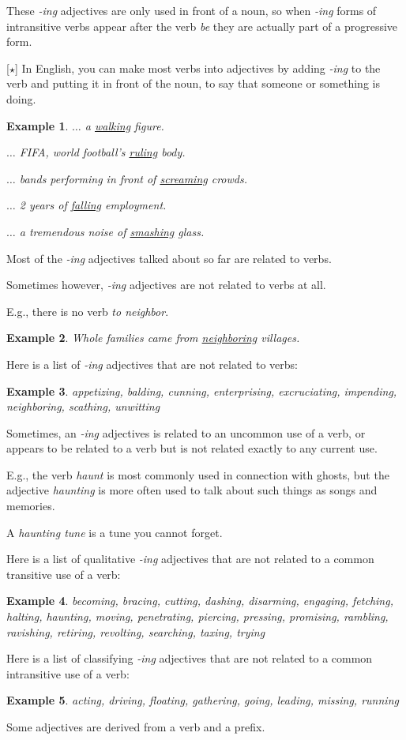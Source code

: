 \documentclass[oneside]{book}
\numberwithin{equation}{section}
\newtheorem{example}{Example}[section]
\begin{document}
%
\noindent{} These \textit{-ing} adjectives are only used in front of a noun, so when \textit{-ing} forms of intransitive verbs appear after the verb \textit{be} they are actually part of a progressive form.

%
\noindent{} [$\star$] In English, you can make most verbs into adjectives by adding \textit{-ing} to the verb and putting it in front of the noun, to say that someone or something is doing.
\begin{example}
    $\ldots$ a \underline{walking} figure.
    
    $\ldots$ FIFA, world football's \underline{ruling} body.
    
    $\ldots$ bands performing in front of \underline{screaming} crowds.
    
    $\ldots$ 2 years of \underline{falling} employment.
    
    $\ldots$ a tremendous noise of \underline{smashing} glass.
\end{example}
%
\noindent{} Most of the \textit{-ing} adjectives talked about so far are related to verbs.

Sometimes however, \textit{-ing} adjectives are not related to verbs at all.

E.g., there is no verb \textit{to neighbor}.
\begin{example}
    Whole families came from \underline{neighboring} villages.
\end{example}
Here is a list of \textit{-ing} adjectives that are not related to verbs:
\begin{example}
    appetizing, balding, cunning, enterprising, excruciating, impending, neighboring, scathing, unwitting
\end{example}
%
\noindent{} Sometimes, an \textit{-ing} adjectives is related to an uncommon use of a verb, or appears to be related to a verb but is not related exactly to any current use.

E.g., the verb \textit{haunt} is most commonly used in connection with ghosts, but the adjective \textit{haunting} is more often used to talk about such things as songs and memories.

A \textit{haunting tune} is a tune you cannot forget.

%
Here is a list of qualitative \textit{-ing} adjectives that are not related to a common transitive use of a verb:
\begin{example}
    becoming, bracing, cutting, dashing, disarming, engaging, fetching, halting, haunting, moving, penetrating, piercing, pressing, promising, rambling, ravishing, retiring, revolting, searching, taxing, trying
\end{example}
Here is a list of classifying \textit{-ing} adjectives that are not related to a common intransitive use of a verb:
\begin{example}
    acting, driving, floating, gathering, going, leading, missing, running
\end{example}
%
\noindent{} Some adjectives are derived from a verb and a prefix.
\end{document}
